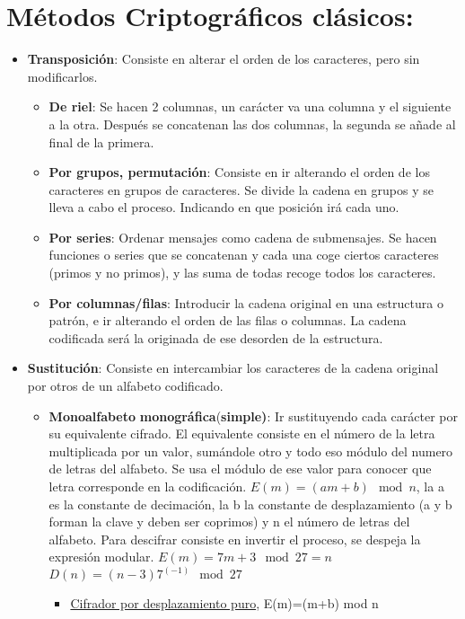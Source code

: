 \documentclass[12pt, twoside, openright]{report} %
\begin{document}
\section{Métodos Criptográficos clásicos:}
\begin{itemize}
	\item \textbf{Transposición}: Consiste en alterar el orden de los caracteres, pero sin modificarlos.
	      \begin{itemize}
		      \item \textbf{De riel}: Se hacen 2 columnas, un carácter va una columna y el siguiente a la otra. Después se concatenan las dos columnas, la segunda se añade al final de la primera.
		      \item \textbf{Por grupos, permutación}: Consiste en ir alterando el orden de los caracteres en grupos de caracteres. Se divide la cadena en grupos y se lleva a cabo el proceso. Indicando en que posición irá cada uno.
		      \item \textbf{Por series}: Ordenar mensajes como cadena de submensajes. Se hacen funciones o series que se concatenan y cada una coge ciertos caracteres (primos y no primos), y las suma de todas recoge todos los caracteres.
		      \item \textbf{Por columnas/filas}: Introducir la cadena original en una estructura o patrón, e ir alterando el orden de las filas o columnas. La cadena codificada será la originada de ese desorden de la estructura.
	      \end{itemize}
	\item \textbf{Sustitución}: Consiste en intercambiar los caracteres de la cadena original por otros de un alfabeto codificado.
	      \begin{itemize}
		      \item \textbf{Monoalfabeto} \textbf{monográfica}(\textbf{simple)}: Ir sustituyendo cada carácter por su equivalente cifrado. El equivalente consiste en el número de la letra multiplicada por un valor, sumándole otro y todo eso módulo del numero de letras del alfabeto. Se usa el módulo de ese valor para conocer que letra corresponde en la codificación. $E(m)=(am+b) \mod n$, la a es la constante de decimación, la b la constante de desplazamiento (a y b forman la clave y deben ser coprimos) y n el número de letras del alfabeto. Para descifrar consiste en invertir el proceso, se despeja la expresión modular. $E(m)=7m+3 \mod 27=n$ $D(n)=(n-3)7^{(-1)} \mod 27$
		            \begin{itemize}
			            \item \underline{Cifrador por desplazamiento puro}, E(m)=(m+b) mod n

\end{itemize}
\end{itemize}
\end{itemize}
\end{document}
